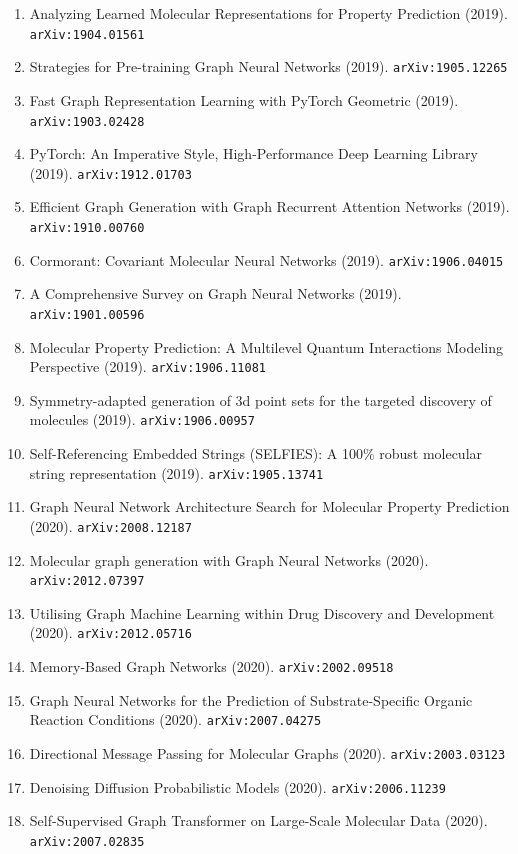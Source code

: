 \documentclass[11pt]{article}
\begin{document}
\begin{enumerate}
  Models (2018). \texttt{arXiv:1811.12823}
  \item Analyzing Learned Molecular Representations for Property Prediction (2019). \texttt{arXiv:1904.01561}
  \item Strategies for Pre-training Graph Neural Networks (2019). \texttt{arXiv:1905.12265}
  \item Fast Graph Representation Learning with PyTorch Geometric (2019). \texttt{arXiv:1903.02428}
  \item PyTorch: An Imperative Style, High-Performance Deep Learning Library (2019). \texttt{arXiv:1912.01703}
  \item Efficient Graph Generation with Graph Recurrent Attention Networks (2019). \texttt{arXiv:1910.00760}
  \item Cormorant: Covariant Molecular Neural Networks (2019). \texttt{arXiv:1906.04015}
  \item A Comprehensive Survey on Graph Neural Networks (2019). \texttt{arXiv:1901.00596}
  \item Molecular Property Prediction: A Multilevel Quantum Interactions
  Modeling Perspective (2019). \texttt{arXiv:1906.11081}
  \item Symmetry-adapted generation of 3d point sets for the targeted discovery
  of molecules (2019). \texttt{arXiv:1906.00957}
  \item Self-Referencing Embedded Strings (SELFIES): A 100\% robust molecular
  string representation (2019). \texttt{arXiv:1905.13741}
  \item Graph Neural Network Architecture Search for Molecular Property
  Prediction (2020). \texttt{arXiv:2008.12187}
  \item Molecular graph generation with Graph Neural Networks (2020). \texttt{arXiv:2012.07397}
  \item Utilising Graph Machine Learning within Drug Discovery and Development (2020). \texttt{arXiv:2012.05716}
  \item Memory-Based Graph Networks (2020). \texttt{arXiv:2002.09518}
  \item Graph Neural Networks for the Prediction of Substrate-Specific Organic
  Reaction Conditions (2020). \texttt{arXiv:2007.04275}
  \item Directional Message Passing for Molecular Graphs (2020). \texttt{arXiv:2003.03123}
  \item Denoising Diffusion Probabilistic Models (2020). \texttt{arXiv:2006.11239}
  \item Self-Supervised Graph Transformer on Large-Scale Molecular Data (2020). \texttt{arXiv:2007.02835}

\end{enumerate}
\end{document}
